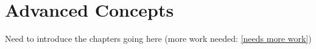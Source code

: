 \chapter{Advanced Concepts}

Need to introduce the chapters going here
(more work needed: \ref{needs more work})